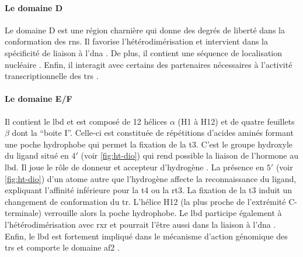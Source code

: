 \documentclass[../main.tex]{subfiles}
\begin{document}
\paragraph{Le domaine D}
Le domaine D est une région charnière qui donne des degrés de liberté dans la conformation des \glspl{rn}.
Il favorise l'hétérodimérisation et intervient dans la spécificité de liaison à l'\gls{dna} \citep{Miyamoto2001}.
De plus, il contient une séquence de localisation nucléaire \citep{Hamy1992a}.
Enfin, il interagit avec certains des partenaires nécessaires à l'activité transcriptionnelle des \glspl{tr} \citep{Lin1991,Horlein1995}.

\paragraph{Le domaine E/F}
Il contient le \gls{lbd} et est composé de 12 hélices $\alpha$ (H1 à H12) et de quatre feuillets $\beta$ dont la ``boite I''.
Celle-ci est constituée de répétitions d'acides aminés formant une poche hydrophobe qui permet la fixation de la \gls{t3}.
C'est le groupe hydroxyle du ligand situé en $4\prime$ (voir \autoref{fig:ht-dio}) qui rend possible la liaison de l'hormone au \gls{lbd}.
Il joue le rôle de donneur et accepteur d’hydrogène \citep{Dietrich1977}.
La présence en $5\prime$ (voir \autoref{fig:ht-dio}) d'un atome autre que l'hydrogène affecte la reconnaissance du ligand, expliquant l'affinité inférieure pour la \gls{t4} ou la \gls{rt3}.
La fixation de la \gls{t3} induit un changement de conformation du \gls{tr}.
L'hélice H12 (la plus proche de l'extrémité C-terminale) verrouille alors la poche hydrophobe.
Le \gls{lbd} participe également à l'hétérodimérisation avec \gls{rxr} \citep{Wagner1995,Bain2007} et pourrait l'être aussi dans la liaison à l'\gls{dna} \citep{Figueira2010}.
Enfin, le \gls{lbd} est fortement impliqué dans le mécanisme d'action génomique des \glspl{tr} et comporte le domaine \gls{af2} \citep{Barettino1994,Tone1994}.

\end{document}
